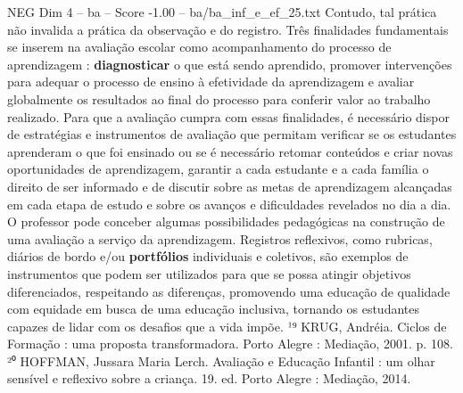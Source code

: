\begin{textsample}{NEG Dim 4 – ba – Score -1.00 – ba/ba\_inf\_e\_ef\_25.txt}
Contudo, tal prática não invalida a prática da observação e do registro.
Três finalidades fundamentais se inserem na avaliação escolar como acompanhamento do processo de aprendizagem : \textbf{diagnosticar} o que está sendo aprendido, promover intervenções para adequar o processo de ensino à efetividade da aprendizagem e avaliar globalmente os resultados ao final do processo para conferir valor ao trabalho realizado.
Para que a avaliação cumpra com essas finalidades, é necessário dispor de estratégias e instrumentos de avaliação que permitam verificar se os estudantes aprenderam o que foi ensinado ou se é necessário retomar conteúdos e criar novas oportunidades de aprendizagem, garantir a cada estudante e a cada família o direito de ser informado e de discutir sobre as metas de aprendizagem alcançadas em cada etapa de estudo e sobre os avanços e dificuldades revelados no dia a dia.
O professor pode conceber algumas possibilidades pedagógicas na construção de uma avaliação a serviço da aprendizagem.
Registros reflexivos, como rubricas, diários de bordo e/ou \textbf{portfólios} individuais e coletivos, são exemplos de instrumentos que podem ser utilizados para que se possa atingir objetivos diferenciados, respeitando as diferenças, promovendo uma educação de qualidade com equidade em busca de uma educação inclusiva, tornando os estudantes capazes de lidar com os desafios que a vida impõe. ¹⁹ KRUG, Andréia.
Ciclos de Formação : uma proposta transformadora.
Porto Alegre : Mediação, 2001. p. 108. ²⁰ HOFFMAN, Jussara Maria Lerch.
Avaliação e Educação Infantil : um olhar sensível e reflexivo sobre a criança. 19. ed.
Porto Alegre : Mediação, 2014.

\end{textsample}
